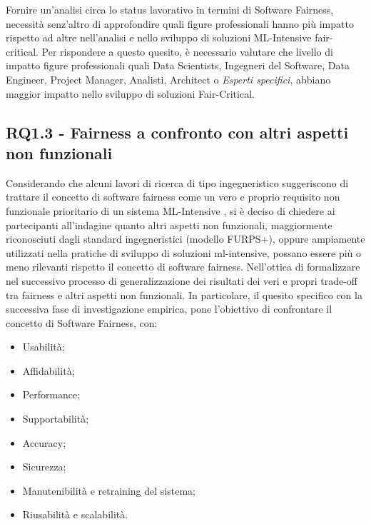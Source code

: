 	Fornire un'analisi circa lo status lavorativo in termini di Software Fairness, necessità senz'altro di approfondire quali figure professionali hanno più impatto rispetto ad altre nell'analisi e nello sviluppo di soluzioni ML-Intensive fair-critical. Per rispondere a questo quesito, è necessario valutare che livello di impatto figure professionali quali Data Scientists, Ingegneri del Software, Data Engineer, Project Manager, Analisti, Architect o \emph{Esperti specifici}, abbiano maggior impatto nello sviluppo di soluzioni Fair-Critical.\\
	
	\subsection{RQ1.3 - Fairness a confronto con altri aspetti non funzionali}
	\begin{center}
		\hspace*{-5mm}%
	\end{center}
	
	Considerando che alcuni lavori di ricerca di tipo ingegneristico suggeriscono di trattare il concetto di software fairness come un vero e proprio requisito non funzionale prioritario di un sistema ML-Intensive \cite{brun2018software}, si è deciso di chiedere ai partecipanti all'indagine quanto altri aspetti non funzionali, maggiormente riconosciuti dagli standard ingegneristici (modello FURPS+), oppure ampiamente utilizzati nella pratiche di sviluppo di soluzioni ml-intensive, possano essere più o meno rilevanti rispetto il concetto di software fairness. Nell'ottica di formalizzare nel successivo processo di generalizzazione dei risultati dei veri e propri trade-off tra fairness e altri aspetti non funzionali. In particolare, il quesito specifico con la successiva fase di investigazione empirica, pone l'obiettivo di confrontare il concetto di Software Fairness, con:
	
	\begin{itemize}
		\item Usabilità;
		\item Affidabilità;
		\item Performance;
		\item Supportabilità;
		\item Accuracy;
		\item Sicurezza;
		\item Manutenibilità e retraining del sistema;
		\item Riusabilità e scalabilità.
	\end{itemize}
	

